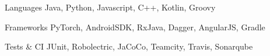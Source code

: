 

\begin{cvskills}

  \cvskill
    {Languages} %
    {Java, Python, Javascript, C++, Kotlin, Groovy} %

  \cvskill
    {Frameworks} %
    {PyTorch, AndroidSDK, RxJava, Dagger, AngularJS, Gradle} %
    
  \cvskill
    {Tests \& CI} %
    {JUnit, Robolectric, JaCoCo, Teamcity, Travis, Sonarqube} %

\end{cvskills}